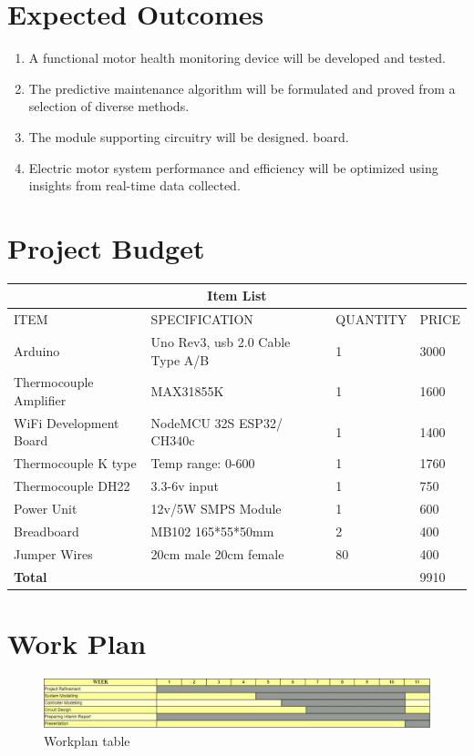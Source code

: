 \section{Expected Outcomes}
\begin{enumerate}
\item A functional motor health monitoring device will be developed and tested.
\item The predictive maintenance algorithm will be formulated and proved from a selection
of diverse methods.
\item The module supporting circuitry will be designed.
board.
\item Electric motor system performance and efficiency will be optimized using insights from real-time data collected.
\end{enumerate}
\newpage
\section{Project Budget}
\setlength{\arrayrulewidth}{0.5mm}
\setlength{\tabcolsep}{18pt}
\renewcommand{\arraystretch}{1.5}
	\begin{tabular}{ |p{3cm}|p{3cm}|p{3cm}|p{3cm}|  }
		\hline
		\multicolumn{4}{|c|}{\textbf{Item List}} \\
		\hline
		ITEM & SPECIFICATION & QUANTITY & PRICE \\
		\hline
		Arduino & Uno Rev3, usb 2.0 Cable Type A/B & 1 & 3000 \\
		\hline
		Thermocouple Amplifier & MAX31855K & 1 & 1600 \\
		\hline
		WiFi Development Board & NodeMCU 32S ESP32/ CH340c  & 1 & 1400 \\
		\hline
		Thermocouple K type&Temp range: 0-600  & 1 & 1760\\
		\hline
		Thermocouple DH22 & 3.3-6v input  & 1 &750 \\
		\hline
		Power Unit & 12v/5W SMPS Module & 1   & 600\\
		\hline
		Breadboard & MB102  165*55*50mm & 2 & 400 \\
		\hline
		Jumper Wires & 20cm male 20cm female & 80 & 400 \\
		\hline
		\textbf{Total} & & &9910 \\
		\hline
	\end{tabular}

\section{Work Plan}
\begin{figure}[!h]
\includegraphics[width=1.059\linewidth]{Figures/workplan1}
\caption{Workplan table}
\end{figure}
